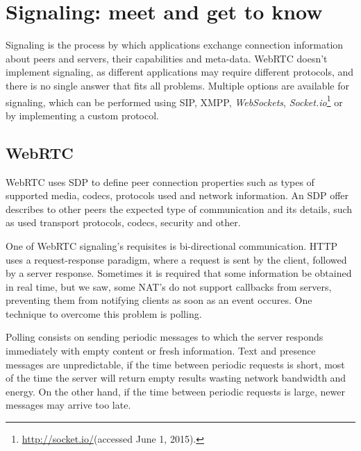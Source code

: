 \section{Signaling: meet and get to know}
\label{signaling}


  Signaling is the process by which applications exchange connection information about peers and servers, their capabilities and meta-data.
  \ac{WebRTC} doesn't implement signaling, as different applications may require different protocols, and there is no single answer that fits all problems.
  Multiple options are available for signaling, which can be performed using \ac{SIP}, \ac{XMPP}, \emph{WebSockets}, \emph{Socket.io}\footnote{\url{http://socket.io/}(accessed June 1, 2015).} or by implementing a custom protocol.

  \subsection{WebRTC}

  \ac{WebRTC} uses \ac{SDP} \cite{rfc4566} to define peer connection properties such as types of supported media, codecs, protocols used and network information. An \ac{SDP} offer describes to other peers the expected type of communication and its details, such as used transport protocols, codecs, security and other.

  One of \ac{WebRTC} signaling's requisites is bi-directional communication.
  \ac{HTTP} uses a request-response paradigm, where a request is sent by the client, followed by a server response.
  Sometimes it is required that some information be obtained in real time, but we saw, some \ac{NAT}'s do not support callbacks from servers, preventing them from notifying clients as soon as an event occures.
One technique to overcome this problem is polling.
  
Polling consists on sending periodic messages to which the server responds immediately with empty content or fresh information. Text and presence messages are unpredictable, if the time between periodic requests is short, most of the time the server will return empty results wasting network bandwidth and energy. On the other hand, if the time between periodic requests is large, newer messages may arrive too late.

